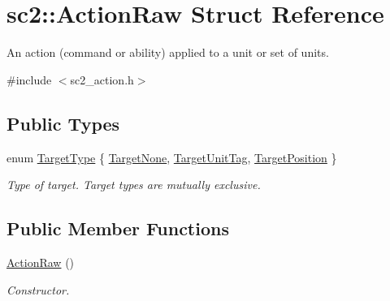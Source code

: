 \hypertarget{structsc2_1_1_action_raw}{}\section{sc2\+:\+:Action\+Raw Struct Reference}
\label{structsc2_1_1_action_raw}


An action (command or ability) applied to a unit or set of units.  




{\ttfamily \#include $<$sc2\+\_\+action.\+h$>$}

\subsection*{Public Types}
\begin{DoxyCompactItemize}
\item 
enum \hyperlink{structsc2_1_1_action_raw_a18505ce7c00e382d636339eba391d800}{Target\+Type} \{ \hyperlink{structsc2_1_1_action_raw_a18505ce7c00e382d636339eba391d800ad76dbb1f34ebecacde71ea8d7b573a01}{Target\+None}, 
\hyperlink{structsc2_1_1_action_raw_a18505ce7c00e382d636339eba391d800a61c42ac7737f36c0c9ee4be66feb1933}{Target\+Unit\+Tag}, 
\hyperlink{structsc2_1_1_action_raw_a18505ce7c00e382d636339eba391d800af9e15c024c14d7dd4570395858a9882a}{Target\+Position}
 \}\begin{DoxyCompactList}\small\item\em Type of target. Target types are mutually exclusive. \end{DoxyCompactList}
\end{DoxyCompactItemize}
\subsection*{Public Member Functions}
\begin{DoxyCompactItemize}
\item 
\mbox{\label{structsc2_1_1_action_raw_a88b07cbf99a78d573969b0c14410ab88}} 
\hyperlink{structsc2_1_1_action_raw_a88b07cbf99a78d573969b0c14410ab88}{Action\+Raw} ()
\begin{DoxyCompactList}\small\item\em Constructor. \end{DoxyCompactList}\end{DoxyCompactItemize}
